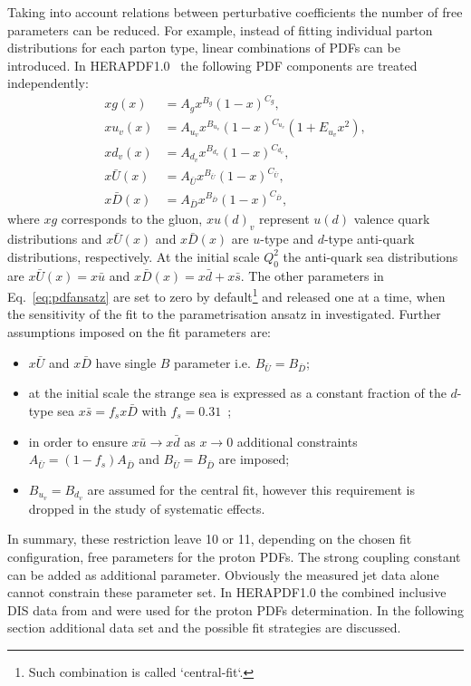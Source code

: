 Taking into account relations between perturbative coefficients the number of free parameters can be reduced. For example, instead of fitting individual parton distributions for each parton type, linear combinations of PDFs can be introduced.  In HERAPDF1.0~\cite{Aaron:2009aa} the following PDF components are treated independently:
\begin{align}
 xg\left(x\right) &= A_gx^{B_g}\left(1-x\right)^{C_g},\\
 xu_v\left(x\right) &= A_{u_v}x^{B_{u_v}}\left(1-x\right)^{C_{u_v}}\left(1+E_{u_v}x^2\right),\\
 xd_v\left(x\right) &= A_{d_v}x^{B_{d_v}}\left(1-x\right)^{C_{d_v}},\\
 x\bar{U}\left(x\right) &= A_{\bar{U}}x^{B_{\bar{U}}}\left(1-x\right)^{C_{\bar{U}}},\\
 x\bar{D}\left(x\right) &= A_{\bar{D}}x^{B_{\bar{D}}}\left(1-x\right)^{C_{\bar{D}}},
\end{align}
where $xg$ corresponds to the gluon, $xu\left(d\right)_v$ represent $u\left(d\right)$ valence quark distributions and $x\bar{U}\left(x\right)$ and $x\bar{D}\left(x\right)$ are $u$-type and $d$-type anti-quark distributions, respectively. At the initial scale $Q^2_0$ the anti-quark sea distributions are $x\bar{U}\left(x\right)=x\bar u$ and $x\bar{D}\left(x\right)=x\bar d+x\bar s$. The other parameters in Eq.~\eqref{eq:pdfansatz} are set to zero by default\footnote{Such combination is called `central-fit`.} and released one at a time, when the sensitivity of the fit to the parametrisation ansatz in investigated. Further assumptions imposed on the fit parameters are:
\begin{itemize}
 \item $x\bar{U}$ and $x\bar{D}$ have single $B$ parameter i.e. $B_{\bar{U}}=B_{\bar{D}}$;
 \item at the initial scale the strange sea is expressed as a constant fraction of the $d$-type sea $x\bar s=f_s x \bar D$ with $f_s=0.31$~\cite{Martin:2009iq,Nadolsky:2008zw};
 \item in order to ensure $x\bar u \rightarrow x\bar d$ as $x\rightarrow 0$ additional constraints $A_{\bar U}=\left(1-f_s\right)A_{\bar D}$ and $B_{\bar U}=B_{\bar D}$ are imposed;
 \item $B_{u_v}=B_{d_v}$ are assumed for the central fit, however this requirement is dropped in the study of systematic effects.
\end{itemize}
In summary, these restriction leave 10 or 11, depending on the chosen fit configuration, free parameters for the proton PDFs. The strong coupling constant \asz can be added as additional parameter. Obviously the measured jet data alone cannot constrain these parameter set. In HERAPDF1.0 the combined inclusive DIS data from \hone and \zeus were used for the proton PDFs determination. In the following section additional data set and the possible fit strategies are discussed.
